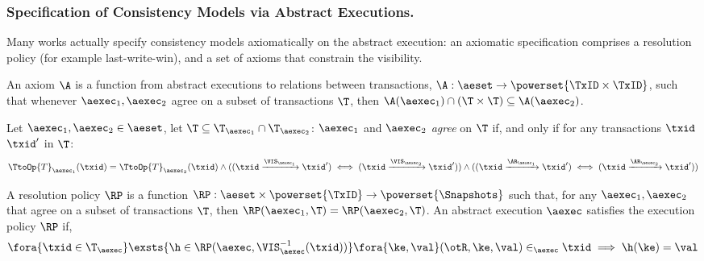 %


\subsubsection{Specification of Consistency Models via Abstract Executions.}
Many works actually specify consistency models axiomatically on the abstract execution: 
an axiomatic specification comprises a resolution policy (for example last-write-win), 
and a set of axioms that constrain the visibility. 


\begin{definition}
An axiom $\A$ is a function from abstract executions to relations between 
transactions, $\A: \aeset \rightarrow \powerset{\TxID \times \TxID}$, 
such that whenever $\aexec_1, \aexec_2$ agree on a subset of 
transactions $\T$, then $\A(\aexec_1) \cap (\T \times \T) \subseteq \A(\aexec_2)$.
\end{definition}

Let $\aexec_1, \aexec_2 \in \aeset$, let $\T \subseteq \T_{\aexec_1} \cap \T_{\aexec_2}$: 
$\aexec_1$ and $\aexec_2$ \emph{agree} on $\T$ if, and only if for any transactions \( \txid \) \( \txid' \) in \( \T \):
\[
\TtoOp{T}_{\aexec_1}(\txid) = \TtoOp{T}_{\aexec_2}(\txid) \wedge 
((\txid \xrightarrow{\VIS_{\aexec_1}} \txid') \iff (\txid \xrightarrow{\VIS_{\aexec_2}} \txid'))
\wedge ((\txid \xrightarrow{\AR_{\aexec_1}} \txid') \iff (\txid \xrightarrow{\AR_{\aexec_2}} \txid'))
\]
\begin{definition}
\label{def:rp}
A resolution policy $\RP$ is a function $\RP: \aeset \times \powerset{\TxID} \rightarrow \powerset{\Snapshots}$ 
such that, for any $\aexec_1, \aexec_2$ that agree on a subset of transactions $\T$, then 
$\RP(\aexec_1, \T) = \RP(\aexec_2, \T)$.
An abstract execution $\aexec$ satisfies the execution policy $\RP$ if, 
\[
    \fora{\txid \in \T_{\aexec} } 
    \exsts{ \h \in \RP(\aexec, \VIS_{\aexec}^{-1}(\txid)) }
    \fora{ \ke,\val } (\otR, \ke, \val) \in_{\aexec} \txid 
    \implies \h(\ke) = \val
\]
\end{definition}

